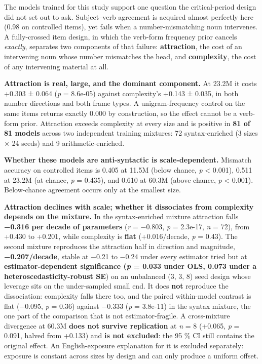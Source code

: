 \documentclass[11pt]{article}
\begin{document}
The models trained for this study support one question the critical-period design did not
set out to ask. Subject--verb agreement is acquired almost perfectly here (0.98 on
controlled items), yet fails when a number-mismatching noun intervenes. A fully-crossed item
design, in which the verb-form frequency prior cancels \emph{exactly},
separates two components of that failure: \textbf{attraction}, the cost of an intervening noun
whose number mismatches the head, and \textbf{complexity}, the cost of any intervening material
at all.

\textbf{Attraction is real, large, and the dominant component.} At 23.2M it costs
+0.303 ± 0.064 (\emph{p} = 8.6e-05) against complexity's +0.143 ± 0.035, in both number
directions and both frame types. A unigram-frequency control on the same items returns
exactly 0.000 by construction, so the effect cannot be a verb-form prior. Attraction exceeds
complexity at every size and is positive in \textbf{81 of 81 models} across two independent
training mixtures: 72 syntax-enriched (3 sizes × 24 seeds) and 9 arithmetic-enriched.

\textbf{Whether these models are anti-syntactic is scale-dependent.} Mismatch accuracy on
controlled items is 0.405 at 11.5M (below chance, \emph{p} \textless{} 0.001), 0.511 at 23.2M (at chance,
\emph{p} = 0.435), and 0.610 at 60.3M (above chance, \emph{p} \textless{} 0.001). Below-chance agreement occurs
only at the smallest size.

\textbf{Attraction declines with scale; whether it dissociates from complexity depends on the
mixture.} In the syntax-enriched mixture attraction falls \textbf{−0.316 per decade of
parameters} (\emph{r} = −0.803, \emph{p} = 2.3e-17, \emph{n} = 72), from +0.430 to +0.201, while complexity
is \textbf{flat} (+0.016/decade, \emph{p} = 0.43). The second mixture reproduces the attraction half
in direction and magnitude, \textbf{−0.207/decade}, stable at −0.21 to −0.24 under every
estimator tried but at \textbf{estimator-dependent significance (\emph{p} = 0.033 under OLS, 0.073
under a heteroscedasticity-robust SE}) on an unbalanced (3, 3, 8) seed design whose
leverage sits on the under-sampled small end. It does \textbf{not} reproduce the dissociation:
complexity falls there too, and the paired within-model contrast is flat (−0.095,
\emph{p} = 0.36) against −0.333 (\emph{p} = 3.8e-11) in the syntax mixture, the one part of the
comparison that is not estimator-fragile. A cross-mixture divergence at 60.3M \textbf{does not
survive replication} at \emph{n} = 8 (+0.065, \emph{p} = 0.091, halved from +0.133) and \textbf{is not
excluded}: the 95 \% CI still contains the original effect. An English-exposure explanation
for it is excluded separately: exposure is constant across sizes by design and can only
produce a uniform offset.
\end{document}
